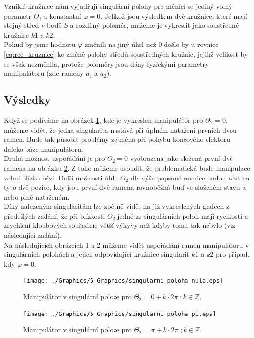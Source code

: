 \documentclass{article}
\begin{document}
			Vzniklé kružnice nám vyjadřují singulární polohy pro měnící se jediný volný parametr \(\Theta_{1}\) a konstantní \(\varphi = 0\).	Jelikož jsou výsledkem dvě kružnice, které mají stejný střed v bodě \(S\) a rozdílný poloměr, můžeme je vykreslit jako soustředné kružnice \(k1\) a \(k2\).\\
			
			Pokud by jsme hodnotu \(\varphi\) změnili na jiný úhel než \(0\) došlo by u rovnice \ref{eq:rce_kruznice} ke změně polohy středů soustředných kružnic, jejihž velikost by se však nezměnila, protože poloměry jsou dány fyzickými parametry manipulátoru (zde rameny \(a_{1}\) a \(a_{2}\)).
		\subsection{Výsledky}
			Když se podíváme na obrázek \ref{pic:singularni_poloha_nula}, kde je vykreslen manipulátor pro \(\Theta_{2}=0\), můžeme vidět, že jedna singularita nastává při úplném natažení prvních dvou ramen. Bude tak působit problémy zejména při pohybu koncového efektoru daleko báze manipulátoru.\\
			
			Druhá možnost uspořádání je pro \(\Theta_{2}=0\) vyobrazena jako složená první dvě ramena na obrázku \ref{pic:singularni_poloha_pi}. Z toho můžeme usoudit, že problematická bude manipulace velmi blízko bázi.
			Další možnosti úhlu \(\Theta_{2}\) dle výše popsané rovnice budou vést na tyto dvě pozice, kdy jsou první dvě ramena rovnoběžná buď ve složeném stavu a nebo plně nataženém.\\
			
			Díky nalezeným singularitám lze zpětně vidět na již vykreslených grafech z předešlých zadání, že při blízkosti \(\Theta_{2}\) jedné ze singulárních poloh mají rychlosti a zrychlení kloubových souřadnic větší výkyvy než kdyby tomu tak nebylo (viz následující zadání).\\
			
			Na následujících obrázcích \ref{pic:singularni_poloha_nula} a \ref{pic:singularni_poloha_pi} můžeme vidět uspořádání ramen manipulátoru v singulárních polohách a jejich odpovídající kružnice singularit \(k1\) a \(k2\) pro případ, kdy \(\varphi = 0\).
				\begin{figure}[H]
					\centering
					\texttt{[image: ./Graphics/5\_Graphics/singularni\_poloha\_nula.eps]}
					\caption{Manipulátor v singulární poloze pro \(\Theta_2 = 0 +k\cdot2\pi \; ;k\in \mathbb{Z}\).}
					\label{pic:singularni_poloha_nula}
				\end{figure}
				\begin{figure}[H]
					\centering
					\texttt{[image: ./Graphics/5\_Graphics/singularni\_poloha\_pi.eps]}
					\caption{Manipulátor v singulární poloze pro \(\Theta_2 = \pi +k\cdot2\pi \; ;k\in \mathbb{Z}\).}
					\label{pic:singularni_poloha_pi}
				\end{figure}
\end{document}
